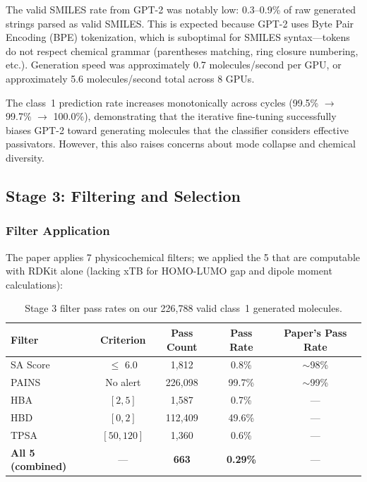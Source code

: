\documentclass[11pt,a4paper]{article}
\begin{document}
The valid SMILES rate from GPT-2 was notably low: 0.3--0.9\% of raw generated strings parsed as valid SMILES. This is expected because GPT-2 uses Byte Pair Encoding (BPE) tokenization, which is suboptimal for SMILES syntax---tokens do not respect chemical grammar (parentheses matching, ring closure numbering, etc.). Generation speed was approximately 0.7 molecules/second per GPU, or approximately 5.6 molecules/second total across 8 GPUs.

The class~1 prediction rate increases monotonically across cycles (99.5\% $\to$ 99.7\% $\to$ 100.0\%), demonstrating that the iterative fine-tuning successfully biases GPT-2 toward generating molecules that the classifier considers effective passivators. However, this also raises concerns about mode collapse and chemical diversity.

\subsection{Stage 3: Filtering and Selection}
\label{sec:filtering}

\subsubsection{Filter Application}

The paper applies 7 physicochemical filters; we applied the 5 that are computable with RDKit alone (lacking xTB for HOMO-LUMO gap and dipole moment calculations):

\begin{table}[H]
\centering
\caption{Stage 3 filter pass rates on our 226,788 valid class~1 generated molecules.}
\label{tab:filters}
\begin{tabular}{lcccc}
\toprule
Filter & Criterion & Pass Count & Pass Rate & Paper's Pass Rate \\
\midrule
SA Score & $\leq$ 6.0 & 1,812 & 0.8\% & $\sim$98\% \\
PAINS & No alert & 226,098 & 99.7\% & $\sim$99\% \\
HBA & $[2, 5]$ & 1,587 & 0.7\% & --- \\
HBD & $[0, 2]$ & 112,409 & 49.6\% & --- \\
TPSA & $[50, 120]$ & 1,360 & 0.6\% & --- \\
\midrule
\textbf{All 5 (combined)} & --- & \textbf{663} & \textbf{0.29\%} & --- \\
\bottomrule
\end{tabular}
\end{table}
\end{document}

